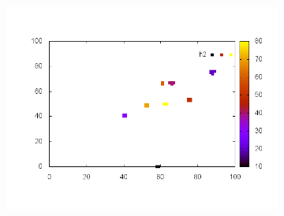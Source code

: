 \documentclass[10pt,a4paper]{article}
\begin{document}
\begin{figure}
\begin{subfigure}[b]{1\textwidth}
\includegraphics[scale=.3]{./img/SCC_Stable3/cut95p/2.png}
\end{subfigure}


\end{figure}
\end{document}
